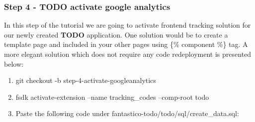 \documentclass[letterpaper,10pt,english]{sphinxmanual}
\begin{document}
\subsubsection{Step 4 - TODO activate google analytics}
\label{how_to/todo/step_4_activate_googleanalytics:step-4-todo-activate-google-analytics}\label{how_to/todo/step_4_activate_googleanalytics::doc}
In this step of the tutorial we are going to activate frontend tracking solution for our newly created \textbf{TODO} application.
One solution would be to create a template page and included in your other pages using \{\% component \%\} tag. A more elegant solution
which does not require any code redeployment is presented below:
\begin{enumerate}
\item {} 
git checkout -b step-4-activate-googleanalytics

\item {} 
fsdk activate-extension --name tracking\_codes --comp-root todo

\item {} 
Paste the following code under fantastico-todo/todo/sql/create\_data.sql:


\end{enumerate}
\end{document}
